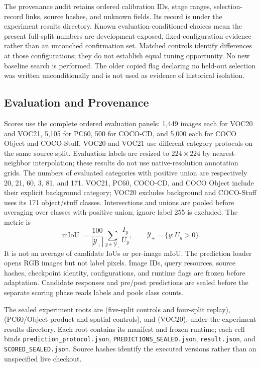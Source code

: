 The provenance audit retains ordered calibration IDs, stage ranges, selection-record links, source hashes, and unknown fields. Its record is  under the experiment results directory. Known evaluation-conditioned choices mean the present full-split numbers are development-exposed, fixed-configuration evidence rather than an untouched confirmation set. Matched controls identify differences at those configurations; they do not establish equal tuning opportunity. No new baseline search is performed. The older copied flag declaring no held-out selection was written unconditionally and is not used as evidence of historical isolation.

\subsection{Evaluation and Provenance}
Scores use the complete ordered evaluation panels: 1,449 images each for VOC20 and VOC21, 5,105 for PC60, 500 for COCO-CD, and 5,000 each for COCO Object and COCO-Stuff. VOC20 and VOC21 use different category protocols on the same source split. Evaluation labels are resized to $224\times224$ by nearest-neighbor interpolation; these results do not use native-resolution annotation grids. The numbers of evaluated categories with positive union are respectively 20, 21, 60, 3, 81, and 171. VOC21, PC60, COCO-CD, and COCO Object include their explicit background category; VOC20 excludes background and COCO-Stuff uses its 171 object/stuff classes. Intersections and unions are pooled before averaging over classes with positive union; ignore label 255 is excluded. The metric is
\begin{equation}
\operatorname{mIoU}=\frac{100}{|\mathcal Y_+|}
\sum_{y\in\mathcal Y_+}\frac{I_y}{U_y},\qquad
\mathcal Y_+=\{y:U_y>0\}.
\end{equation}
It is not an average of candidate IoUs or per-image mIoU. The prediction loader opens RGB images but not label pixels. Image IDs, query resources, source hashes, checkpoint identity, configurations, and runtime flags are frozen before adaptation. Candidate responses and pre/post predictions are sealed before the separate scoring phase reads labels and pools class counts.

The sealed experiment roots are  (five-split controls and four-split replay),  (PC60/Object product and spatial controls), and  (VOC20), under the experiment results directory. Each root contains its manifest and frozen runtime; each cell binds \texttt{prediction\_protocol.json}, \texttt{PREDICTIONS\_SEALED.json}, \texttt{result.json}, and \texttt{SCORED\_SEALED.json}. Source hashes identify the executed versions rather than an unspecified live checkout.

